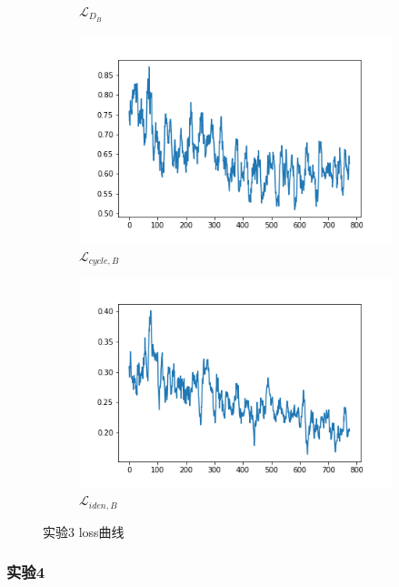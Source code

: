 \documentclass[twocolumn,11pt]{ctexart}
\begin{document}
\begin{figure}[htb]
\begin{subfigure}[b]{0.23\linewidth}
        \caption{$\mathcal{L}_{D_B}$}
      \end{subfigure}
      \begin{subfigure}[b]{0.23\linewidth}
        \includegraphics[width=\linewidth]{exp3_cycle_B.png}
        \caption{$\mathcal{L}_{cycle,B}$}
      \end{subfigure}
      \begin{subfigure}[b]{0.23\linewidth}
        \includegraphics[width=\linewidth]{exp3_idt_B.png}
        \caption{$\mathcal{L}_{iden,B}$}
      \end{subfigure}
      \caption{实验3 loss曲线}
      \label{fig:exp3loss}
\end{figure}

\subsubsection{实验4}
\end{document}
